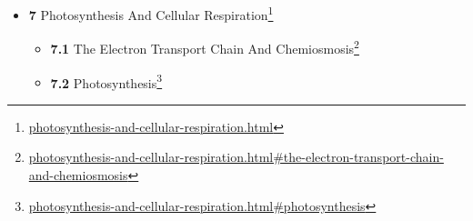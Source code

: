 \documentclass[
]{article}
\providecommand{\tightlist}{%
  \setlength{\itemsep}{0pt}\setlength{\parskip}{0pt}}
\providecommand{\tightlist}{%
  \setlength{\itemsep}{0pt}\setlength{\parskip}{0pt}}
\let\rmarkdownfootnote\footnote%
\def\footnote{\protect\rmarkdownfootnote}
\renewcommand{\href}[2]{#2\footnote{\url{#1}}}
\theoremstyle{definition}
\theoremstyle{definition}
\theoremstyle{definition}
\theoremstyle{remark}
\begin{document}
\begin{itemize}
\begin{itemize}
    \begin{itemize}
    \tightlist
    \item
      \href{bioenergetics.html\#allosteric-modulation}{\emph{}\textbf{6.4.1}
      Allosteric Modulation}
    \item
      \href{bioenergetics.html\#cofactors-of-enzymes-and-coenzymes}{\emph{}\textbf{6.4.2}
      Cofactors of Enzymes and Coenzymes}
    \item
      \href{bioenergetics.html\#inhibition-of-enzymes}{\emph{}\textbf{6.4.3}
      Inhibition of Enzymes}
    \item
      \href{bioenergetics.html\#factors-affecting-enzyme-activity}{\emph{}\textbf{6.4.4}
      Factors Affecting Enzyme Activity}
    \item
      \href{bioenergetics.html\#control-of-activity}{\emph{}\textbf{6.4.5}
      Control of activity}
    \item
      \href{bioenergetics.html\#post-translational-modification}{\emph{}\textbf{6.4.6}
      Post-translational Modification}
    \item
      \href{bioenergetics.html\#quantity}{\emph{}\textbf{6.4.7}
      Quantity}
    \item
      \href{bioenergetics.html\#subcellular-distribution}{\emph{}\textbf{6.4.8}
      Subcellular Distribution}
    \item
      \href{bioenergetics.html\#organ-specialization}{\emph{}\textbf{6.4.9}
      Organ Specialization}
    \item
      \href{bioenergetics.html\#coenzymes}{\emph{}\textbf{6.4.10}
      Coenzymes}
    \item
      \href{bioenergetics.html\#mineral-cofactors}{\emph{}\textbf{6.4.11}
      Mineral Cofactors}
    \end{itemize}
  \end{itemize}
\item
  \href{photosynthesis-and-cellular-respiration.html}{\emph{}\textbf{7}
  Photosynthesis And Cellular Respiration}

  \begin{itemize}
  \tightlist
  \item
    \href{photosynthesis-and-cellular-respiration.html\#the-electron-transport-chain-and-chemiosmosis}{\emph{}\textbf{7.1}
    The Electron Transport Chain And Chemiosmosis}
  \item
    \href{photosynthesis-and-cellular-respiration.html\#photosynthesis}{\emph{}\textbf{7.2}
    Photosynthesis}


\end{itemize}
\end{itemize}
\end{document}

